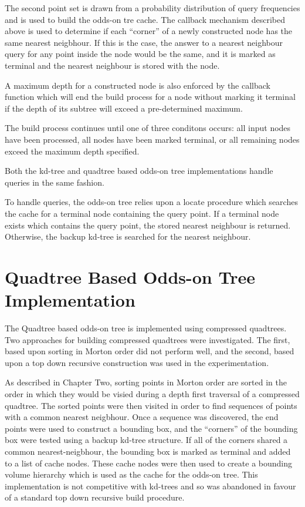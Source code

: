 \documentclass[mcs]{scsthesis}
\begin{document}
The second point set is drawn from a probability distribution of query
frequencies and is used to build the odds-on tre cache. The callback mechanism
described above is used to determine if each ``corner'' of a newly constructed
node has the same nearest neigbhour. If this is the case, the answer to a
nearest neighbour query for any point inside the node would be the same, and it
is marked as terminal and the nearest neighbour is stored with the node.

A maximum depth for a constructed node is also enforced by the callback
function which will end the build process for a node without marking it
terminal if the depth of its subtree will exceed a pre-determined maximum.

The build process continues until one of three conditons occurs: all input nodes
have been processed, all nodes have been marked terminal, or all remaining nodes
exceed the maximum depth specified.

Both the kd-tree and quadtree based odds-on tree implementations handle queries
in the same fashion.

To handle queries, the odds-on tree relies upon a locate procedure which
searches the cache for a terminal node containing the query point. If a terminal
node exists which contains the query point, the stored nearest neighbour is
returned. Otherwise, the backup kd-tree is searched for the nearest neighbour.

\section{Quadtree Based Odds-on Tree Implementation}

The Quadtree based odds-on tree is implemented using compressed quadtrees. Two
approaches for building compressed quadtrees were investigated. The first,
based upon sorting in Morton order did not perform well, and the second, based
upon a top down recursive construction was used in the experimentation.

As described in Chapter Two, sorting points in Morton order are sorted in the
order in which they would be visied during a depth first traversal of a
compressed quadtree. The sorted points were then visited in order to find
sequences of points with a common nearest neigbhour. Once a sequence was
discovered, the end points were used to construct a bounding box, and the
``corners'' of the bounding box were tested using a backup kd-tree structure.
If all of the corners shared a common nearest-neigbhour, the bounding box is
marked as terminal and added to a list of cache nodes. These cache nodes were
then used to create a bounding volume hierarchy which is used as the cache for
the odds-on tree. This implementation is not competitive with kd-trees and so
was abandoned in favour of a standard top down recursive build procedure.
\end{document}

